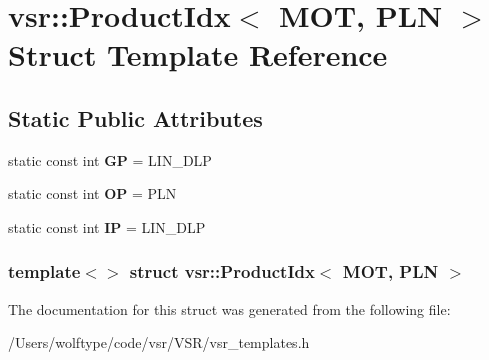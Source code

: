\hypertarget{structvsr_1_1_product_idx_3_01_m_o_t_00_01_p_l_n_01_4}{\section{vsr\-:\-:Product\-Idx$<$ M\-O\-T, P\-L\-N $>$ Struct Template Reference}
\label{structvsr_1_1_product_idx_3_01_m_o_t_00_01_p_l_n_01_4}
}
\subsection*{Static Public Attributes}
\begin{DoxyCompactItemize}
\item 
\hypertarget{structvsr_1_1_product_idx_3_01_m_o_t_00_01_p_l_n_01_4_a4b25c7305e16ac57d3bf1378d4b82f6c}{static const int {\bfseries G\-P} = L\-I\-N\-\_\-\-D\-L\-P}\label{structvsr_1_1_product_idx_3_01_m_o_t_00_01_p_l_n_01_4_a4b25c7305e16ac57d3bf1378d4b82f6c}

\item 
\hypertarget{structvsr_1_1_product_idx_3_01_m_o_t_00_01_p_l_n_01_4_a8dc848392ac6b4828c5ac7408efcf04b}{static const int {\bfseries O\-P} = P\-L\-N}\label{structvsr_1_1_product_idx_3_01_m_o_t_00_01_p_l_n_01_4_a8dc848392ac6b4828c5ac7408efcf04b}

\item 
\hypertarget{structvsr_1_1_product_idx_3_01_m_o_t_00_01_p_l_n_01_4_a066a1af610c4568497d679a0774e81d0}{static const int {\bfseries I\-P} = L\-I\-N\-\_\-\-D\-L\-P}\label{structvsr_1_1_product_idx_3_01_m_o_t_00_01_p_l_n_01_4_a066a1af610c4568497d679a0774e81d0}

\end{DoxyCompactItemize}
\subsubsection*{template$<$$>$ struct vsr\-::\-Product\-Idx$<$ M\-O\-T, P\-L\-N $>$}



The documentation for this struct was generated from the following file\-:\begin{DoxyCompactItemize}
\item 
/\-Users/wolftype/code/vsr/\-V\-S\-R/vsr\-\_\-templates.\-h\end{DoxyCompactItemize}

